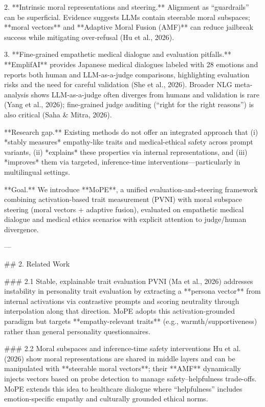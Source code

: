 2. **Intrinsic moral representations and steering.** Alignment as “guardrails” can be superficial. Evidence suggests LLMs contain steerable moral subspaces; **moral vectors** and **Adaptive Moral Fusion (AMF)** can reduce jailbreak success while mitigating over-refusal (Hu et al., 2026).

3. **Fine-grained empathetic medical dialogue and evaluation pitfalls.** **EmplifAI** provides Japanese medical dialogues labeled with 28 emotions and reports both human and LLM-as-a-judge comparisons, highlighting evaluation risks and the need for careful validation (She et al., 2026). Broader NLG meta-analysis shows LLM-as-a-judge often diverges from humans and validation is rare (Yang et al., 2026); fine-grained judge auditing (“right for the right reasons”) is also critical (Saha & Mitra, 2026).

**Research gap.** Existing methods do not offer an integrated approach that (i) *stably measures* empathy-like traits and medical-ethical safety across prompt variants, (ii) *explains* these properties via internal representations, and (iii) *improves* them via targeted, inference-time interventions—particularly in multilingual settings.

**Goal.** We introduce **MoPE**, a unified evaluation-and-steering framework combining activation-based trait measurement (PVNI) with moral subspace steering (moral vectors + adaptive fusion), evaluated on empathetic medical dialogue and medical ethics scenarios with explicit attention to judge/human divergence.

---

## 2. Related Work  

### 2.1 Stable, explainable trait evaluation  
PVNI (Ma et al., 2026) addresses instability in personality trait evaluation by extracting a **persona vector** from internal activations via contrastive prompts and scoring neutrality through interpolation along that direction. MoPE adopts this activation-grounded paradigm but targets **empathy-relevant traits** (e.g., warmth/supportiveness) rather than general personality questionnaires.

### 2.2 Moral subspaces and inference-time safety interventions  
Hu et al. (2026) show moral representations are shared in middle layers and can be manipulated with **steerable moral vectors**; their **AMF** dynamically injects vectors based on probe detection to manage safety–helpfulness trade-offs. MoPE extends this idea to healthcare dialogue where “helpfulness” includes emotion-specific empathy and culturally grounded ethical norms.


